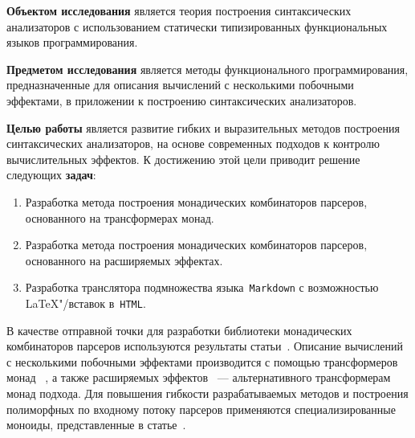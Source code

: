 \textbf{Объектом исследования} является теория построения синтаксических анализаторов
с использованием статически типизированных функциональных языков программирования.

\textbf{Предметом исследования} является методы функционального программирования,
предназначенные для описания вычислений с несколькими побочными эффектами,
в приложении к построению синтаксических анализаторов.

\textbf{Целью работы} является развитие гибких и выразительных методов построения
синтаксических анализаторов, на основе современных подходов к контролю вычислительных
эффектов.
К достижению этой цели приводит решение следующих \textbf{задач}:
\begin{enumerate}
  \item Разработка метода построения монадических комбинаторов парсеров,
  основанного на трансформерах монад.
  \item Разработка метода построения монадических комбинаторов парсеров,
  основанного на расширяемых эффектах.
  \item Разработка транслятора подмножества языка~\lstinline{Markdown} с возможностью
  \LaTeX"/вставок в~\lstinline{HTML}.
\end{enumerate}

В качестве отправной точки для разработки библиотеки монадических комбинаторов
парсеров используются результаты статьи~\cite{monParsing}. Описание вычислений
с несколькими побочными эффектами производится с помощью трансформеров монад
~\cite{monadTransformers}, а также расширяемых эффектов~\cite{extEffects} ---
альтернативного трансформерам монад подхода. Для повышения гибкости разрабатываемых
методов и построения полиморфных по входному потоку парсеров применяются
специализированные моноиды, представленные в статье~\cite{monoids}.
